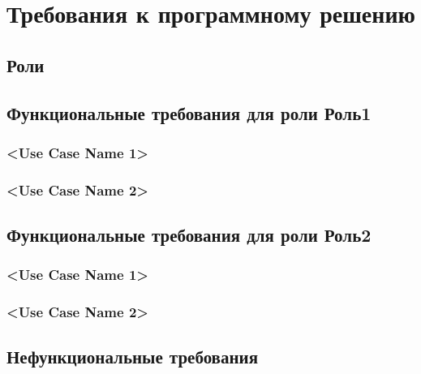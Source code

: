 \chapter{Требования к программному решению}
	\label{chapter3}

	\section{Роли}

	\section{Функциональные требования для роли Роль1}
		\subsection{<Use Case Name 1>}

		\subsection{<Use Case Name 2>}
	\section{Функциональные требования для роли Роль2}
		\subsection{<Use Case Name 1>}

		\subsection{<Use Case Name 2>}

	\section{Нефункциональные требования}
